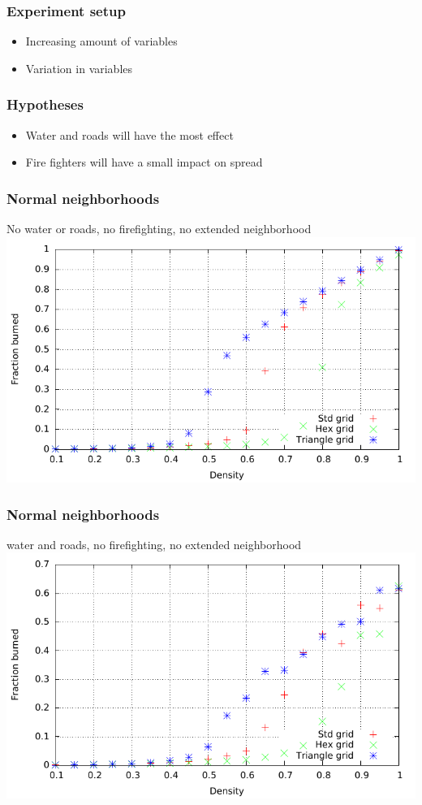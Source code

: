 \documentclass{beamer}
\begin{document}
\begin{frame}
\frametitle{Experiment setup}
\begin{itemize}
\item{Increasing amount of variables}
\item{Variation in variables}
\end{itemize}
\end{frame}

\begin{frame}
\frametitle{Hypotheses}
\begin{itemize}
\item{Water and roads will have the most effect}
\item{Fire fighters will have a small impact on spread}
\end{itemize}
\end{frame}

\begin{frame}
\frametitle{Normal neighborhoods}
No water or roads, no firefighting, no extended neighborhood
\centering
\includegraphics[width=\textwidth]{imgs/plot/ex1/fracburned.pdf}
\end{frame}

\begin{frame}
\frametitle{Normal neighborhoods}
water and roads, no firefighting, no extended neighborhood
\centering
\includegraphics[width=\textwidth]{imgs/plot/ex3/fracburned.pdf}
\end{frame}
\end{document}
